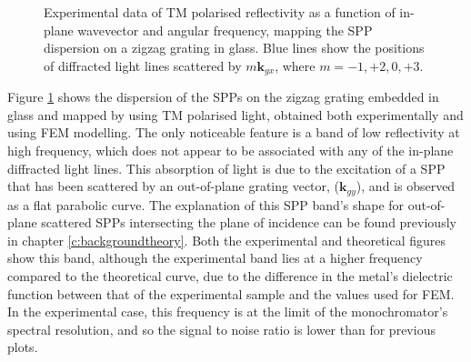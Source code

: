 \begin{figure}
\begin{center}
\caption[SPP dispersion on a zigzag grating in glass measured using TM polarised light.]{Experimental data of TM polarised reflectivity as a function of in-plane wavevector and angular frequency, mapping the SPP dispersion on a zigzag grating in glass. \color{blue}Blue \color{black} lines show the positions of diffracted light lines scattered by $m\mathbf{k}_{gx}$, where $m = −1, +2, 0, +3$. \label{fig:shallowzz-dispersion-TM-both}}
\end{center}
\end{figure}

Figure \ref{fig:shallowzz-dispersion-TM-both} shows the dispersion of the SPPs on the zigzag grating embedded in glass and mapped by using TM polarised light, obtained both experimentally and using FEM modelling. The only noticeable feature is a band of low reflectivity at high frequency, which does not appear to be associated with any of the in-plane diffracted light lines. This absorption of light is due to the excitation of a SPP that has been scattered by an out-of-plane grating vector, ($\mathbf{k}_{gy}$), and is observed as a flat parabolic curve. The explanation of this SPP band's shape for out-of-plane scattered SPPs intersecting the plane of incidence can be found previously in chapter \ref{c:backgroundtheory}. Both the experimental and theoretical figures show this band, although the experimental band lies at a higher frequency compared to the theoretical curve, due to the difference in the metal's dielectric function between that of the experimental sample and the values used for FEM. In the experimental case, this frequency is at the limit of the monochromator's spectral resolution, and so the signal to noise ratio is lower than for previous plots.

